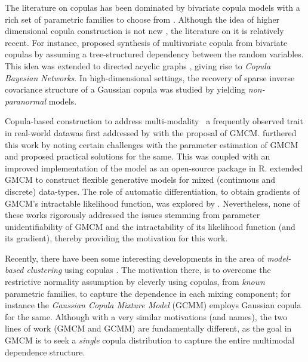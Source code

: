 \documentclass{article}
\begin{document}
The literature on copulas has been dominated by bivariate copula models with a rich set of parametric families to choose from \citep{Nelsen1999introduction}. Although the idea of higher dimensional copula construction is not new \citep[see][]{Genest1995Multivariate, Joe1993Multivariate,Kojadinovic2010RpackageMVcopula}, the literature on it is relatively recent. For instance, \citet{Bedford2002,Kurowicka2009Book,Czado2010PairCopula} proposed  synthesis of multivariate copula from bivariate copulas by assuming a tree-structured dependency between the random variables. This idea was extended to directed acyclic graphs \citep[see][]{Elidan2010,Hanea2006CBN},  giving rise to \emph{Copula Bayesian Networks}. In high-dimensional settings, the recovery of sparse inverse covariance structure of a Gaussian copula was studied by \citet{Liu2009} yielding  \emph{non-paranormal} models.

Copula-based construction to address multi-modality \textemdash \ a frequently observed trait in real-world data\textemdash was first addressed by \citet{Tewari2011} with the proposal of GMCM. \citet{Bilgrau2016} furthered this work by noting certain challenges with the parameter estimation of GMCM and proposed practical solutions for the same. This was coupled with an improved implementation of the model as an open-source package \citep{Bilgrau_Rpackage} in R. \citet{Rajan2016_GMCM_mixed_data} extended GMCM to construct flexible generative models for mixed (continuous and discrete) data-types. The role of automatic differentiation, to obtain gradients of GMCM's intractable likelihood function, was explored by \citet{kasa2018}. Nevertheless, none of these works rigorously addressed the issues stemming from parameter unidentifiability of GMCM and the intractability of its likelihood function (and its gradient), thereby providing the motivation for this work.

Recently, there have been some interesting developments in the area of \emph{model-based clustering} using copulas \citep{Kosmidis2016,Mazo2017,Marbac2017,Rey2012_CopulaMixture}. The motivation there, is to overcome the restrictive normality assumption by cleverly using copulas, from \emph{known} parametric families, to capture the dependence in each mixing component; for instance the \emph{Gaussian Copula Mixture Model} (GCMM) \citep{Marbac2017} employs Gaussian copula for the same. Although with a very similar motivations (and names), the two lines of work (GMCM and GCMM) are fundamentally different, as the goal in GMCM is to seek a \emph{single} copula distribution to capture the entire multimodal dependence structure. 
\end{document}
